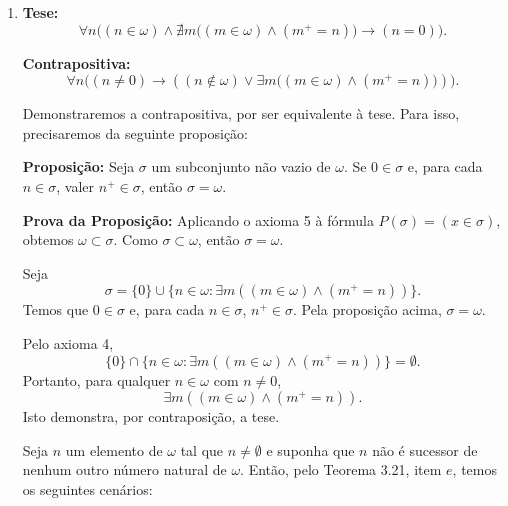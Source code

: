 \begin{enumerate}[label=(\alph{*})]
	\item  
	\begin{solucao}[ 1]
		
		\textbf{Tese:}
			\[
			\forall n \big((n \in \omega) \wedge \nexists m \big((m \in \omega) \wedge (m^+ = n)\big) \to (n = 0)\big).
			\]
			
			\textbf{Contrapositiva:}  
			\[
			\forall n \big((n \neq 0) \to ((n \notin \omega) \vee \exists m \big((m \in \omega) \wedge (m^+ = n)\big))\big).
			\]
			
			Demonstraremos a contrapositiva, por ser equivalente à tese. Para isso, precisaremos da seguinte proposição:
			
			\vspace{0.3cm}
			\textbf{Proposição:} Seja $\sigma$ um subconjunto não vazio de $\omega$. Se $0 \in \sigma$ e, para cada $n \in \sigma$, valer $n^+ \in \sigma$, então $\sigma = \omega$.
			
			\vspace{0.3cm}
			\textbf{Prova da Proposição:} Aplicando o axioma 5 à fórmula $P(\sigma) = (x \in \sigma)$, obtemos $\omega \subset \sigma$. Como $\sigma \subset \omega$, então $\sigma = \omega$.  
			
			Seja 
			\[
			\sigma = \{0\} \cup \{n \in \omega : \exists m ((m \in \omega) \wedge (m^+ = n))\}.
			\]
			Temos que $0 \in \sigma$ e, para cada $n \in \sigma$, $n^+ \in \sigma$. Pela proposição acima, $\sigma = \omega$.  
			
			Pelo axioma 4, 
			\[
			\{0\} \cap \{n \in \omega : \exists m ((m \in \omega) \wedge (m^+ = n))\} = \emptyset.
			\]
			Portanto, para qualquer $n \in \omega$ com $n \neq 0$,  
			\[
			\exists m ((m \in \omega) \wedge (m^+ = n)).
			\]
			Isto demonstra, por contraposição, a tese.
	\end{solucao}
	
	\begin{solucao}[ 2]
		Seja $n$ um elemento de $\omega$ tal que $n \neq \emptyset$ e suponha que $n$ não é sucessor de nenhum outro número natural de $\omega$. Então, pelo Teorema 3.21, item $e$, temos os seguintes cenários:
		

\end{solucao}
\end{enumerate}
